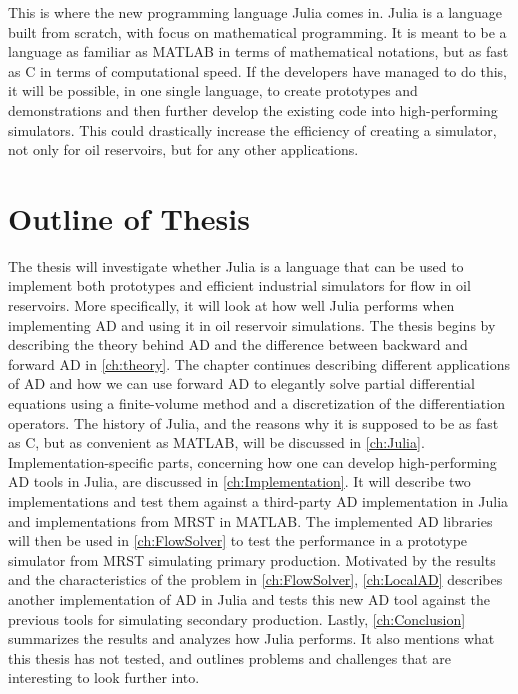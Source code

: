 This is where the new programming language Julia comes in. Julia is a language built from scratch, with focus on mathematical programming. It is meant to be a language as familiar as MATLAB in terms of mathematical notations, but as fast as C in terms of computational speed. If the developers have managed to do this, it will be possible, in one single language, to create prototypes and demonstrations and then further develop the existing code into high-performing simulators. This could drastically increase the efficiency of creating a simulator, not only for oil reservoirs, but for any other applications. 

\section{Outline of Thesis}
The thesis will investigate whether Julia is a language that can be used to implement both prototypes and efficient industrial simulators for flow in oil reservoirs. More specifically, it will look at how well Julia performs when implementing AD and using it in oil reservoir simulations. The thesis begins by describing the theory behind AD and the difference between backward and forward AD in \autoref{ch:theory}. The chapter continues describing different applications of AD and how we can use forward AD to elegantly solve partial differential equations using a finite-volume method and a discretization of the differentiation operators. The history of Julia, and the reasons why it is supposed to be as fast as C, but as convenient as MATLAB, will be discussed in \autoref{ch:Julia}. Implementation-specific parts, concerning how one can develop high-performing AD tools in Julia, are discussed in \autoref{ch:Implementation}. It will describe two implementations and test them against a third-party AD implementation in Julia and implementations from MRST in MATLAB. The implemented AD libraries will then be used in \autoref{ch:FlowSolver} to test the performance in a prototype simulator from MRST simulating primary production. Motivated by the results and the characteristics of the problem in \autoref{ch:FlowSolver}, \autoref{ch:LocalAD} describes another implementation of AD in Julia and tests this new AD tool against the previous tools for simulating secondary production. Lastly, \autoref{ch:Conclusion} summarizes the results and analyzes how Julia performs. It also mentions what this thesis has not tested, and outlines problems and challenges that are interesting to look further into.